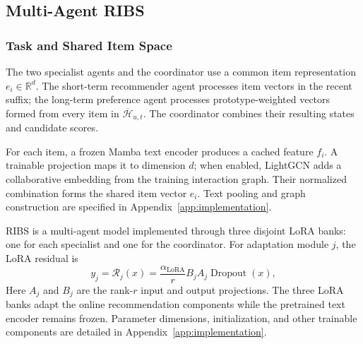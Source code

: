\documentclass[11pt]{article}
\begin{document}
\subsection{Multi-Agent RIBS}
\label{sec:ribs}

\subsubsection{Task and Shared Item Space}
The two specialist agents and the coordinator use a common item representation $e_i\in\mathbb R^d$. The short-term recommender agent processes item vectors in the recent suffix; the long-term preference agent processes prototype-weighted vectors formed from every item in $\overline{\mathcal H}_{u,t}$. The coordinator combines their resulting states and candidate scores.

For each item, a frozen Mamba text encoder produces a cached feature $f_i$. A trainable projection maps it to dimension $d$; when enabled, LightGCN \citep{LightGCN} adds a collaborative embedding from the training interaction graph. Their normalized combination forms the shared item vector $e_i$. Text pooling and graph construction are specified in Appendix~\ref{app:implementation}.

RIBS is a multi-agent model implemented through three disjoint LoRA banks: one for each specialist and one for the coordinator. For adaptation module $j$, the LoRA residual is
\begin{equation}
 y_j=\mathcal R_j(x)=\frac{\alpha_{\mathrm{LoRA}}}{r}B_j A_j\operatorname{Dropout}(x),
\end{equation}
Here $A_j$ and $B_j$ are the rank-$r$ input and output projections. The three LoRA banks adapt the online recommendation components while the pretrained text encoder remains frozen. Parameter dimensions, initialization, and other trainable components are detailed in Appendix~\ref{app:implementation}.
\end{document}
